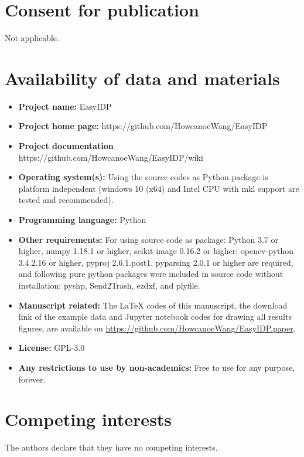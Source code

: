 \documentclass[doublespacing]{configs/bmcart}
\begin{document}
\begin{backmatter}
\section*{Consent for publication}
Not applicable.

\section*{Availability of data and materials}
\begin{itemize}
  \item \textbf{Project name:} EasyIDP
  \item \textbf{Project home page:} https://github.com/HowcanoeWang/EasyIDP
  \item \textbf{Project documentation} https://github.com/HowcanoeWang/EasyIDP/wiki
  \item \textbf{Operating system(s):} Using the source codes as Python package is platform independent (windows 10 (x64) and Intel CPU with \acrfull*{mkl} support are tested and recommended).
  \item \textbf{Programming language: } Python
  \item \textbf{Other requirements:} For using source code as package: Python 3.7 or higher, numpy 1.18.1 or higher, scikit-image 0.16.2 or higher; opencv-python 3.4.2.16 or higher, pyproj 2.6.1.post1, pyparsing 2.0.1 or higher are required, and following pure python packages were included in source code without installation: pyshp, Send2Trash, ezdxf, and plyfile.
  \item \textbf{Manuscript related:} The LaTeX codes of this manuscript, the download link of the example data and Jupyter notebook codes for drawing all results figures, are available on \url{https://github.com/HowcanoeWang/EasyIDP.paper}.
  \item \textbf{License:} GPL-3.0
  \item \textbf{Any restrictions to use by non-academics:} Free to use for any purpose, forever.
\end{itemize}

\section*{Competing interests}
The authors declare that they have no competing interests.



\end{backmatter}
\end{document}
